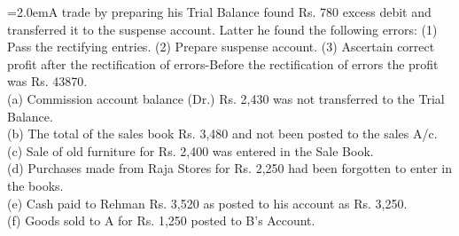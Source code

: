 \documentclass[11pt,a4paper]{article}
\newcommand{\lqn}[2]{\Needspace{6\baselineskip}\par\medskip\noindent\hangindent=2.0em\hangafter=1\makebox[2.0em][l]{\textbf{#1.}}#2\par}
\begin{document}
\lqn{148}{A trade by preparing his Trial Balance found Rs. 780 excess debit and transferred it to the suspense account. Latter he found the following errors: (1) Pass the rectifying entries. (2) Prepare suspense account. (3) Ascertain correct profit after the rectification of errors-Before the rectification of errors the profit was Rs. 43870.\\
(a) Commission account balance (Dr.) Rs. 2,430 was not transferred to the Trial Balance.\\
(b) The total of the sales book Rs. 3,480 and not been posted to the sales A/c.\\
(c) Sale of old furniture for Rs. 2,400 was entered in the Sale Book.\\
(d) Purchases made from Raja Stores for Rs. 2,250 had been forgotten to enter in the books.\\
(e) Cash paid to Rehman Rs. 3,520 as posted to his account as Rs. 3,250.\\
(f) Goods sold to A for Rs. 1,250 posted to B’s Account.\par
}
\end{document}
